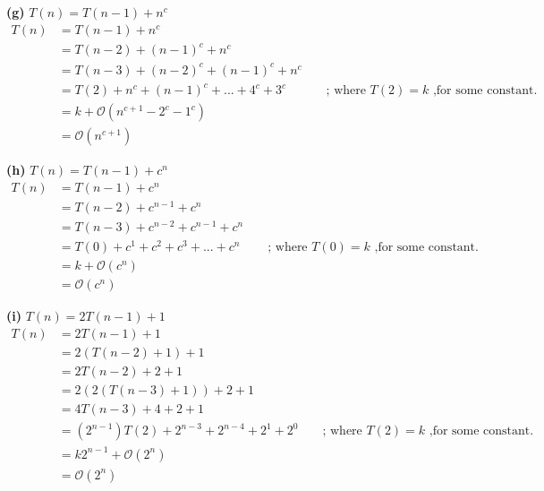 \documentclass[a4paper, 12pt]{article}
\renewcommand{\part}[1] {\vspace{.10in} {\bf (#1)}}
\begin{document}
\part{g} $T(n) = T(n-1) + n^c$
\begin{align*}
	T(n) &= T(n-1) + n^c\\
	&= T(n-2) + (n-1)^c + n^c\\
	&= T(n-3) + (n-2)^c + (n-1)^c + n^c\\
	&= T(2) + n^c + (n-1)^c + ... + 4^c + 3^c && \text{ ; where } T(2) = k \text{ ,for some constant.}\\
	&= k + \mathcal{O}(n^{c+1}-2^c-1^c)\\
	&= \mathcal{O}(n^{c+1})
\end{align*}

\part{h} $T(n) = T(n-1) + c^n$
\begin{align*}
	T(n) &= T(n-1) + c^n\\
	&= T(n-2) + c^{n-1} + c^n\\
	&= T(n-3) + c^{n-2} + c^{n-1} + c^n\\
	&= T(0) + c^{1} + c^2 +c^3 +...+ c^n && \text{ ; where } T(0) = k \text{ ,for some constant.}\\
	&= k + \mathcal{O}(c^n)\\
	&= \mathcal{O}(c^n)
\end{align*}

\part{i} $T(n) = 2T(n-1) + 1$
\begin{align*}
	T(n) &= 2T(n-1) + 1\\
	&= 2(T(n-2)+1)+1\\
	&= 2T(n-2) + 2 +1\\
	&= 2(2(T(n-3)+1))+2+1\\
	&= 4T(n-3)+4+2+1\\
	&= (2^{n-1})T(2)+2^{n-3}+2^{n-4}+2^1+2^0 && \text{ ; where } T(2) = k \text{ ,for some constant.}\\
	&= k2^{n-1} + \mathcal{O}(2^n)\\
	&= \mathcal{O}(2^n)	
\end{align*}
\end{document}
